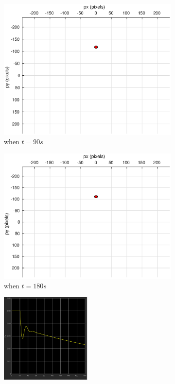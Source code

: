\begin{figure}[htbp]
\begin{subfigure}[t]{0.32\linewidth}
		\includegraphics[width=\textwidth]{images/chapter4/inertial_camera_5mps_90s}
		\caption{when $t=90s$}
	\end{subfigure}
	\begin{subfigure}[t]{0.32\linewidth}
		\includegraphics[width=\textwidth]{images/chapter4/inertial_camera_5mps_180s}
		\caption{when $t=180s$}
	\end{subfigure}	
	\begin{subfigure}[t]{0.8\linewidth}
		\centering
		\includegraphics[width=0.5\textwidth]{images/chapter4/inertial_Ex_5mps}

\end{subfigure}
\end{figure}
